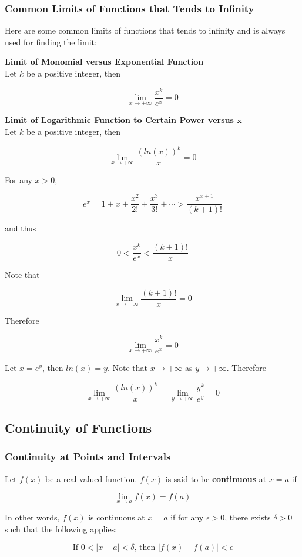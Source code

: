 \documentclass[a4paper,12pt]{article}
\begin{document}
\subsubsection{Common Limits of Functions that Tends to Infinity}
\begin{thm}
  Here are some common limits of functions that tends to infinity and is always used for finding the limit:

  \begin{alist}
    \item \textbf{Limit of Monomial versus Exponential Function}\\
    Let $k$ be a positive integer, then

    $$\lim_{x\to +\infty}\frac{x^{k}}{e^{x}}=0$$

    \item \textbf{Limit of Logarithmic Function to Certain Power versus $\boldsymbol{x}$}\\
    Let $k$ be a positive integer, then

    $$\lim_{x\to +\infty}\frac{(ln(x))^{k}}{x}=0$$

  \end{alist}

   For any $x>0$,

  $$e^{x}=1+x+\frac{x^{2}}{2!}+\frac{x^{3}}{3!}+\cdots>\frac{x^{x+1}}{(k+1)!}$$\s

  and thus

  $$0<\frac{x^{k}}{e^{x}}<\frac{(k+1)!}{x}$$\s

  Note that

  $$\lim_{x\to +\infty}\frac{(k+1)!}{x}=0$$\s

  Therefore

  $$\lim_{x\to +\infty}\frac{x^{k}}{e^{x}}=0$$\s

   Let $x=e^{y}$, then $ln(x)=y$. Note that $x\to +\infty$ as $y\to +\infty$. Therefore

  $$\lim_{x\to +\infty}\frac{(ln(x))^{k}}{x}=\lim_{y\to +\infty}\frac{y^{k}}{e^{y}}=0$$
\end{thm}

\subsection{Continuity of Functions}
\subsubsection{Continuity at Points and Intervals}
\begin{dft}
  Let $f(x)$ be a real-valued function. $f(x)$ is said to be \textbf{continuous} at $x=a$ if

  $$\lim_{x\to a}f(x)=f(a)$$\s

  In other words, $f(x)$ is continuous at $x=a$ if for any $\epsilon>0$, there exists $\delta>0$ such that the following applies:

  $$\text{If }0<\left| x-a\right| <\delta\text{, then }\left| f(x)-f(a)\right| <\epsilon$$
\end{dft}\n
\end{document}
